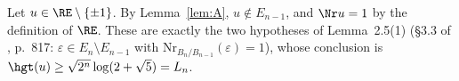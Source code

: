 Let $u\in\RE\setminus\{\pm1\}$. By Lemma~\ref{lem:A}, $u\notin E_{n-1}$, and $\Nr u=1$ by the definition of $\RE$. These are exactly the two hypotheses of \cite{MO16} Lemma~2.5(1) (\S3.3 of \cite{MO16}, p.~817: $\varepsilon\in E_n\setminus E_{n-1}$ with $\mathrm{Nr}_{B_n/B_{n-1}}(\varepsilon)=1$), whose conclusion is $\hgt(u)\ge\sqrt{2^n}\log(2+\sqrt5)=L_n$.
